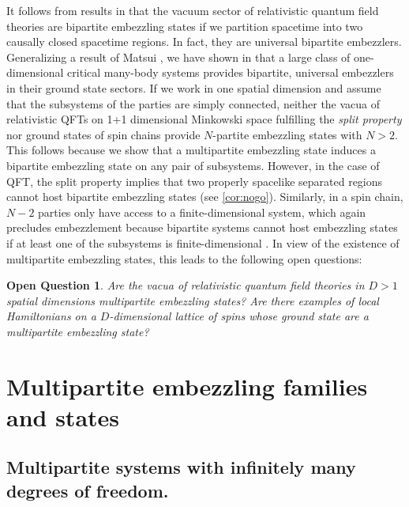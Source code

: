 \documentclass[a4paper, 10pt, onecolumn, accepted=2025-07-22]{quantumarticle}
\newtheorem*{introquestion}{Open Question}
\theoremstyle{definition}
\newcommand*{\1}{\text{\usefont{U}{bbold}{m}{n}1}}
\begin{document}
It follows from results in \cite{long_paper} that the vacuum sector of relativistic quantum field theories are bipartite embezzling states if we partition spacetime into two causally closed spacetime regions. 
In fact, they are universal bipartite embezzlers.
Generalizing a result of Matsui \cite{matsui_split_2001,keyl2006}, we have shown in \cite{van_luijk_critical_2024} that a large class of one-dimensional critical many-body systems provides bipartite, universal embezzlers in their ground state sectors. 
If we work in one spatial dimension and assume that the subsystems of the parties are simply connected, neither the vacua of relativistic QFTs on 1+1 dimensional Minkowski space fulfilling the \emph{split property} \cite{buchholz_product_1974,buchholz_causal_1986,buchholz_noethers_1986,werner_local_1987} nor ground states of spin chains  provide $N$-partite embezzling states with $N>2$.
This follows because we show that a multipartite embezzling state induces a bipartite embezzling state on any pair of subsystems. 
However, in the case of QFT, the split property implies that two properly spacelike separated regions cannot host bipartite embezzling states (see \cref{cor:nogo}).
Similarly, in a spin chain, $N-2$ parties only have access to a finite-dimensional system, which again precludes embezzlement because bipartite systems cannot host embezzling states if at least one of the subsystems is finite-dimensional  \cite{long_paper}.
In view of the existence of multipartite embezzling states, this leads to the following open questions:

\begin{introquestion} 
    Are the vacua of relativistic quantum field theories in $D>1$ spatial dimensions multipartite embezzling states? Are there examples of local Hamiltonians on a $D$-dimensional lattice of spins whose ground state are a multipartite embezzling state?
\end{introquestion}


\section{Multipartite embezzling families and states}

\subsection{Multipartite systems with infinitely many degrees of freedom.}
\end{document}

